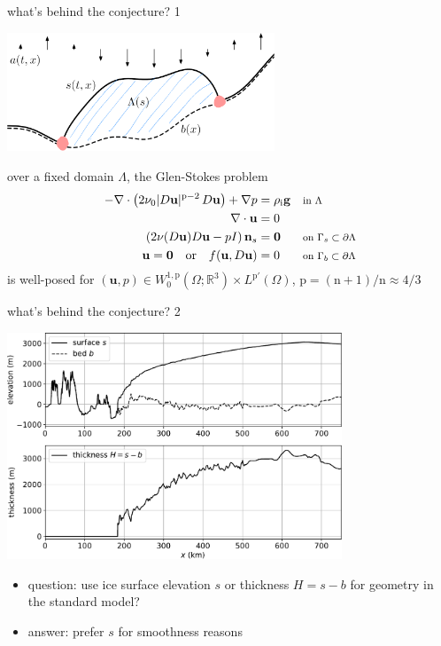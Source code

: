 \documentclass[10pt,dvipsnames]{beamer}
\theoremstyle{theorem}
\newcommand{\bg}{\mathbf{g}}
\newcommand{\bn}{\mathbf{n}}
\newcommand{\bu}{\mathbf{u}}
\newcommand{\bzero}{\bm{0}}
\newcommand{\RR}{\mathbb{R}}
\newcommand{\nn}{\mathrm{n}}
\newcommand{\pp}{\mathrm{p}}
\newcommand{\rhoi}{\rho_{\text{i}}}
\newcommand{\where}[1]{\text{\footnotesize #1}}
\begin{document}
\begin{frame}{what's behind the conjecture? 1}

\begin{center}
\includegraphics[width=0.6\textwidth]{stokesdomain}
\end{center}

\begin{theorem}
over a fixed domain $\Lambda$, the Glen-Stokes problem
\begin{align*}
- \nabla \cdot \left(2 \nu_0 |D\bu|^{\pp-2}\, D\bu\right) + \nabla p &= \rhoi \bg && \where{in $\Lambda$} \\
\nabla \cdot \bu &= 0 \\
\left(2 \nu(D\bu) D\bu - pI\right) \bn_s &= \bzero && \where{on $\Gamma_s \subset \partial\Lambda$} \\
\bu  = \bzero \quad \text{or} \quad f(\bu,D\bu) &= 0 && \where{on $\Gamma_b \subset \partial\Lambda$}
\end{align*}
is well-posed for $(\bu,p) \in W^{1,\pp}_0(\Omega;\RR^3) \times L^{\pp'}(\Omega)$, $\pp=(\nn+1)/\nn\approx 4/3$
\end{theorem}
\end{frame}


\begin{frame}{what's behind the conjecture? 2}

\bigskip
\begin{center}
\includegraphics[width=0.75\textwidth]{giscross}
\end{center}

\begin{itemize}
\item question: use ice surface elevation $s$ or thickness $H = s - b$ for geometry in the standard model?
\item answer: prefer $s$ for smoothness reasons
\end{itemize}
\end{frame}
\end{document}
